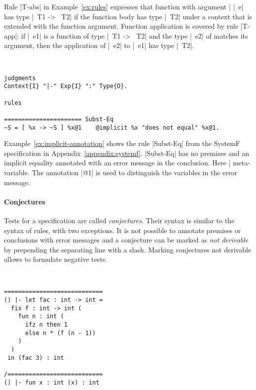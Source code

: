 Rule \code|T-abs| in Example~\ref{ex:rules} expresses that function
with argument \code|%
\code|~e| has type \code|~T1 -> ~T2| if the function body has type
\code|~T2| under a context that is extended with the function
argument. Function application is covered by rule \code|T-app|: if
\code|~e1| is a function of type \code|~T1 -> ~T2| and the type
\code|~e2| of matches its argument, then the application of \code|~e2|
to \code|~e1| has type \code|~T2|.

\begin{example}{~}
\begin{lstlisting}[language=sltc]
judgments
Context{I} "|-" Exp{I} ":" Type{O}.

rules

====================== Subst-Eq
~S = [ %x -> ~S ] %x@1    @implicit %x "does not equal" %x@1.
\end{lstlisting}
\label{ex:implicit-annotation}
\end{example}

Example~\ref{ex:implicit-annotation} shows the rule \code|Subst-Eq|
from the SystemF specification in
Appendix~\ref{appendix:systemf}. \code|Subst-Eq| has no premises and
an implicit equality annotated with an error message in the
conclusion. Here \code|%
meta-variable. The annotation \code|@1| is used to distinguish the
variables in the error message.

\paragraph{Conjectures} Tests for a specification are called
\textit{conjectures}. Their syntax is similar to the syntax of rules,
with two exceptions. It is not possible to annotate premises or
conclusions with error messages and a conjecture can be marked as
\textit{not derivable} by prepending the separating line with a
slash. Marking conjectures not derivable allows to formulate negative
tests.

\begin{example}{~}
\begin{lstlisting}[language=sltc]
============================
() |- let fac : int -> int = 
  fix f : int -> int (
    fun n : int (
      ifz n then 1 
      else n * (f (n - 1))
    )
  )
 in (fac 3) : int

/===========================
() |- fun x : int (x) : int
\end{lstlisting}
\label{ex:conjecture-section}
\end{example}


